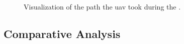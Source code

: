             \begin{figure}[H]
                \centering
                \caption{
                    Visualization of the path the uav took during the .
                }
                \label{fig:rbl_forest_conservative_flight_path}
            \end{figure}



        \subsection{Comparative Analysis}
    
